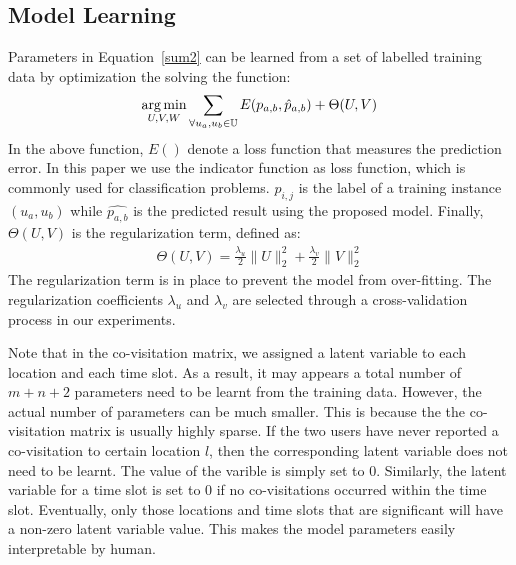 \subsection{Model Learning}

Parameters in Equation~\ref{sum2} can be learned from a set of labelled training data by optimization the solving the function:
\begin{align}\label{opt}
\operatorname*{arg\,min}_{U, V, W} \sum_{ \forall u_a, u_b \in \mathbb{U} } E( p_{a,b}, \hat{p}_{a,b} ) + \Theta(U, V)
\end{align}
In the above function, $E()$ denote a loss function that measures the prediction error. In this paper we use the indicator function as loss function, which is commonly used for classification problems. $p_{i,j}$ is the label of a training instance $(u_a, u_b)$ while $ \hat{p_{a,b}}$ is the predicted result using the proposed model. Finally, $\Theta(U, V)$ is the regularization term, defined as:
\begin{align}
\Theta(U, V) = \frac{\lambda_u}{2} \| U \|_2^2 + \frac{\lambda_v}{2} \| V \|_2^2
\end{align}
The regularization term is in place to prevent the model from over-fitting. The regularization coefficients $\lambda_u$ and $\lambda_v$ are selected through a cross-validation process in our experiments.

Note that in the co-visitation matrix, we assigned a latent variable to each location and each time slot. As a result, it may appears a total number of $m+n+2$ parameters need to be learnt from the training data. However, the actual number of parameters can be much smaller. This is because the the co-visitation matrix is usually highly sparse. If the two users have never reported a co-visitation to certain location $l$, then the corresponding latent variable does not need to be learnt. The value of the varible is simply set to 0. Similarly, the latent variable for a time slot is set to 0 if no co-visitations occurred within the time slot. Eventually, only those locations and time slots that are significant will have a non-zero latent variable value. This makes the model parameters easily interpretable by human.